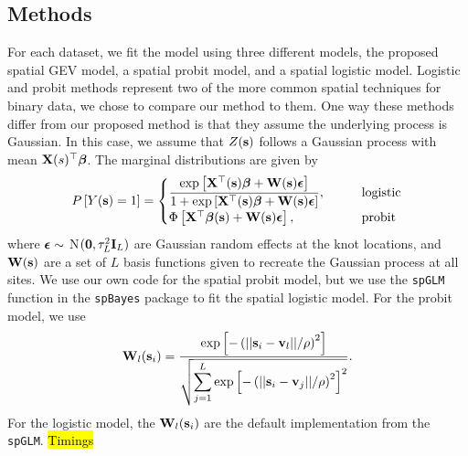 \subsection{Methods} \label{rbs:methods}
For each dataset, we fit the model using three different models, the proposed spatial GEV model, a spatial probit model, and a spatial logistic model.
Logistic and probit methods represent two of the more common spatial techniques for binary data, we chose to compare our method to them.
One way these methods differ from our proposed method is that they assume the underlying process is Gaussian.
In this case, we assume that $Z(\mathbf{s})$ follows a Gaussian process with mean $\mathbf{X}(s)^\top \mbox{\boldmath $\beta$}$.
The marginal distributions are given by
\begin{align}
  P\left[Y(\mathbf{s}) = 1\right] = \begin{cases}
    \displaystyle \frac{\exp\left[\mathbf{X}^\top(\mathbf{s}) \mbox{\boldmath $\beta$} + \mathbf{W} (\mathbf{s}) \mbox{\boldmath $\epsilon$} \right]}{1 + \exp\left[\mathbf{X}^\top(\mathbf{s}) \mbox{\boldmath $\beta$} + \mathbf{W} (\mathbf{s}) \mbox{\boldmath $\epsilon$} \right]}, \qquad &\text{logistic}\\
    \Phi\left[\mathbf{X}^\top \mbox{\boldmath $\beta$} (\mathbf{s}) + \mathbf{W} (\mathbf{s}) \mbox{\boldmath $\epsilon$} \right], \qquad &\text{probit}
  \end{cases}
\end{align}
where $\mbox{\boldmath $\epsilon$} \sim$ N$(\mathbf{0}, \tau^2_L \mathbf{I}_L)$ are Gaussian random effects at the knot locations, and $\mathbf{W}(\mathbf{s})$ are a set of $L$ basis functions given to recreate the Gaussian process at all sites.
We use our own code for the spatial probit model, but we use the \texttt{spGLM} function in the \texttt{spBayes} package \citep{Finley2015} to fit the spatial logistic model.
For the probit model, we use
\begin{align}
  \mathbf{W}_l(\mathbf{s}_i) = \frac{\exp\left[-\left(||\mathbf{s}_i-\mathbf{v}_l||/\rho\right)^2\right]}
                 {\sqrt{\displaystyle \sum_{j=1}^L\exp\left[-\left(||\mathbf{s}_i-\mathbf{v}_j||/\rho\right)^2\right]^2}}.
\end{align}
For the logistic model, the $\mathbf{W}_l(\mathbf{s}_i)$ are the default implementation from the \texttt{spGLM}.
\hl{Timings}

